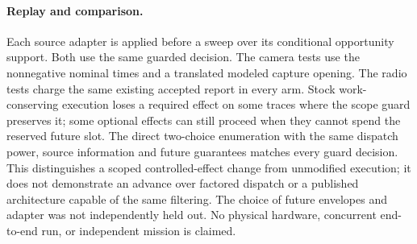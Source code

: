 \documentclass{article}
\begin{document}
\paragraph{Replay and comparison.}
Each source adapter is applied before a sweep over its conditional
opportunity support. Both use the same guarded decision.
The camera tests use the nonnegative nominal times and
a translated modeled capture opening. The radio tests charge the
same existing accepted report in every arm. Stock work-conserving
execution loses a required effect on some traces where the scope
guard preserves it; some optional effects can still proceed when
they cannot spend the reserved future slot. The direct two-choice
enumeration with the same dispatch power, source information and
future guarantees matches every guard decision. This distinguishes
a scoped controlled-effect change from unmodified execution; it
does not demonstrate an advance over factored dispatch or a
published architecture capable of the same filtering. The choice of
future envelopes and adapter was not independently held out. No
physical hardware, concurrent end-to-end run, or independent mission
is claimed.
\end{document}
